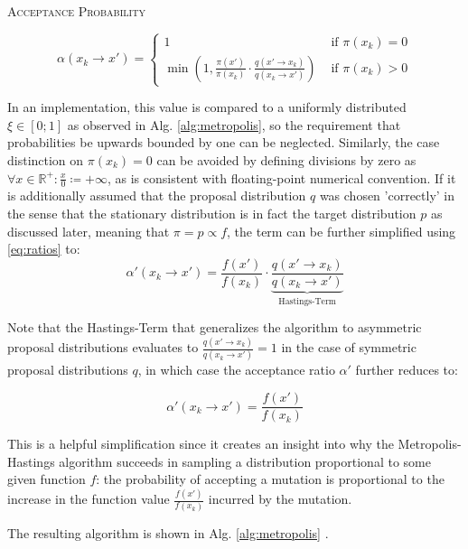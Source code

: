 \documentclass[oneside, a4paper]{article}
\newcommand{\equationnamed}[2]{%
  \setlength{\fboxsep}{2pt} %
  \setlength{\fboxrule}{0.01pt}
  \begin{center}
    \begin{minipage}{\textwidth}
      \begin{center}\textsc{#1}\end{center}
      #2
    \end{minipage}
  \end{center}
}
\newcommand\br[1]{\left(#1\right)}
\begin{document}
\equationnamed{Acceptance Probability}{\begin{equation}\label{eq:alpha-general}
  \alpha\br{x_k \to x'} = \begin{cases}
    1 &\text{ if } \pi(x_k) = 0\\
    \min\br{1, \frac{\pi\br{x'}}{\pi(x_k)} \cdot \frac{q\br{x'\to x_k}}{q\br{x_k \to x'}}} &\text{ if } \pi(x_k) > 0
  \end{cases}
\end{equation}}

In an implementation, this value is compared to a uniformly distributed $\xi \in [0;1]$ as observed in Alg. \ref{alg:metropolis}, so the requirement that probabilities be upwards bounded by one can be neglected. Similarly, the case distinction on $\pi(x_k)=0$ can be avoided by defining divisions by zero as $\forall x \in \mathds{R}^+: \frac{x}{0} \coloneq +\infty$, as is consistent with floating-point numerical convention. If it is additionally assumed that the proposal distribution $q$ was chosen 'correctly' in the sense that the stationary distribution is in fact the target distribution $p$ as discussed later, meaning that $\pi = p \propto f$, the term can be further simplified using \autoref{eq:ratios} to:
\begin{equation}\label{eq:alpha-computational}
  \alpha'\br{x_k\to x'} = \frac{f\br{x'}}{f(x_k)} \cdot \underbrace{\frac{q\br{x'\to x_k}}{q\br{x_k \to x'}}}_{\text{Hastings-Term}}
\end{equation}

Note that the Hastings-Term that generalizes the algorithm to asymmetric proposal distributions evaluates to $\frac{q\br{x'\to x_k}}{q\br{x_k \to x'}}=1$ in the case of symmetric proposal distributions $q$, in which case the acceptance ratio $\alpha'$ further reduces to:

\begin{equation}\label{eq:alpha-symmetric}
  \alpha'\br{x_k\to x'} = \frac{f\br{x'}}{f(x_k)} 
\end{equation}

This is a helpful simplification since it creates an insight into why the Metropolis-Hastings algorithm succeeds in sampling a distribution proportional to some given function $f$: the probability of accepting a mutation is proportional to the increase in the function value $\frac{f(x')}{f(x_k)}$ incurred by the mutation.

The resulting algorithm is shown in Alg. \ref{alg:metropolis} \autocite{survey}.
\end{document}
